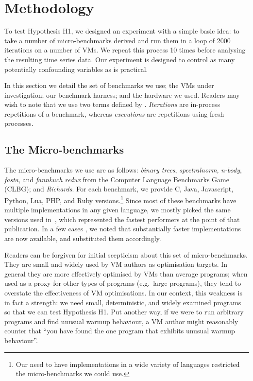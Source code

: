 \documentclass[10pt,preprint]{sigplanconf}
\newcommand{\hypone}{H1\xspace}
\newcommand{\binarytrees}{\emph{binary trees}\xspace}
\newcommand{\richards}{\emph{Richards}\xspace}
\newcommand{\spectralnorm}{\emph{spectralnorm}\xspace}
\newcommand{\nbody}{\emph{n-body}\xspace}
\newcommand{\fasta}{\emph{fasta}\xspace}
\newcommand{\fannkuch}{\emph{fannkuch redux}\xspace}
\begin{document}
\section{Methodology}
\label{sec:methodology}

To test Hypothesis H1, we designed an experiment with a simple basic idea: to
take a number of micro-benchmarks derived and
run them in a loop of 2000 iterations on a number of VMs. We repeat this
process 10 times before analysing the resulting time series data. Our
experiment is designed to control as many potentially confounding variables as
is practical.

In this section we detail the set of benchmarks we use; the VMs under
investigation; our benchmark harness;
and the hardware we used. Readers may wish to note that we use two terms defined
by \cite{kalibera13rigorous}. \emph{Iterations} are in-process repetitions of a
benchmark, whereas \emph{executions} are repetitions using fresh processes.


\subsection{The Micro-benchmarks}

The micro-benchmarks we use are as follows: \binarytrees, \spectralnorm, \nbody,
\fasta, and \fannkuch from the Computer Language Benchmarks Game (CLBG); and
\richards. For each benchmark, we provide C, Java, Javascript, Python, Lua, PHP,
and Ruby versions.\footnote{Our need to have implementations in a wide variety
of languages restricted the micro-benchmarks we could use.} Since most of these
benchmarks have multiple implementations in any given language, we mostly picked
the same versions used in~\cite{bolz14impact}, which represented the fastest
performers at the point of that publication. In a few cases , we noted that
substantially faster implementations are now available, and substituted them
accordingly.

Readers can be forgiven for initial scepticism about this set of micro-benchmarks.
They are small and widely
used by VM authors as optimisation targets. In general they are more effectively
optimised by VMs than average programs; when used as a proxy for other types
of programs (e.g.~large programs), they tend to overstate the effectiveness of
VM optimisations. In our context, this weakness is in fact a strength: we need
small, deterministic, and widely examined programs so that we can test
Hypothesis \hypone. Put another way, if we were to run arbitrary programs
and find unusual warmup behaviour, a VM author might reasonably counter that
``you have found the one program that exhibits unusual warmup behaviour''.
\end{document}
